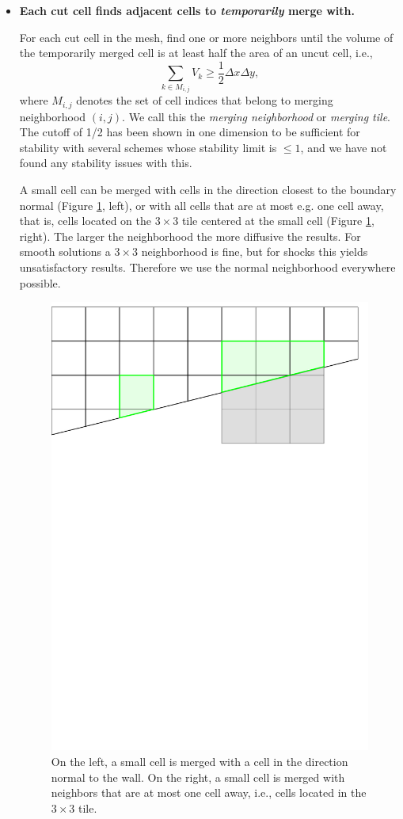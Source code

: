 \begin{itemize}
\item
{\bf Each cut cell finds adjacent cells to {\em temporarily} merge with.}

\vspace*{.1in}
For each cut cell in the mesh, find  one or more neighbors until the
volume of the temporarily merged cell is at least half the area of an uncut cell, i.e., 
\begin{equation} \label{eqn:vmerge}
\sum_{k \in M_{i,j}} V_{k} \geq \frac{1}{2}\Delta x\Delta y,
\end{equation}
where $M_{i,j}$ denotes the set of cell indices that belong to 
merging neighborhood $(i,j)$.  We call this the 
{\em  merging neighborhood} or {\em merging tile}.  
The cutoff of 1/2 has been shown in one dimension to be sufficient for
stability with several schemes whose stability limit is $\le 1$, and we
have not found any stability issues with this.

A small cell can be merged with cells in the direction closest to the 
boundary normal (Figure \ref{fig:neighborhoods}, left), or with all cells 
that are at most e.g. one cell away, that is, cells located on the $3 \times 3$ 
tile centered at the small cell (Figure \ref{fig:neighborhoods}, right).
The larger the neighborhood the more diffusive the results. 
For smooth solutions a $3 \times 3$ neighborhood is fine, but for shocks this 
yields unsatisfactory results.
Therefore we use the normal neighborhood everywhere possible.

\begin{figure}[t]
    \centering
    \includegraphics[width=0.5\linewidth]{figs/neighborhoods.pdf}
    \caption{\sf On the left, a small cell is merged with a cell in the direction 
    normal to  the wall.  On the right, a small cell is merged with neighbors that are at most one cell away, i.e., cells located in the $3\times3$ tile.}
    \label{fig:neighborhoods}
\end{figure}



\end{itemize}
